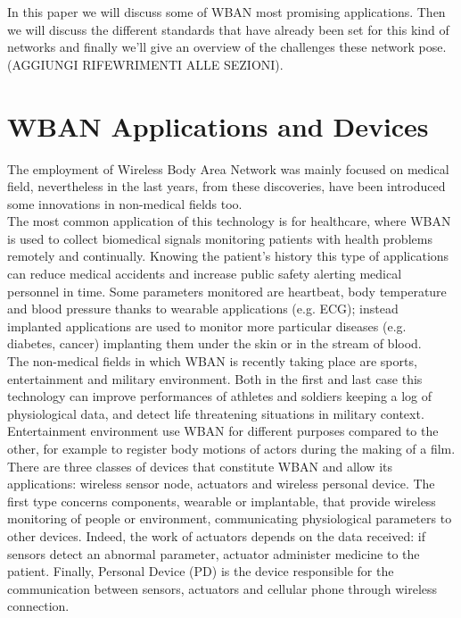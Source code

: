 \documentclass[conference]{IEEEtran}
\begin{document}
In this paper we will discuss some of WBAN most promising applications. Then we will discuss the different standards that have already been set for this kind of networks and finally we’ll give an overview of the challenges these network pose. (AGGIUNGI RIFEWRIMENTI ALLE SEZIONI).




\section{WBAN Applications and Devices}
The employment of Wireless Body Area Network was mainly focused on medical field, nevertheless in the last years, from these discoveries, have been introduced some innovations in non-medical fields too.
\\The most common application of this technology is for healthcare, where WBAN is used to collect biomedical signals monitoring patients with health problems remotely and continually. 
Knowing the patient's history this type of applications can reduce medical accidents and increase public safety alerting medical personnel in time. Some parameters monitored are heartbeat, body temperature and blood pressure thanks to wearable applications (e.g. ECG); instead implanted applications are used to monitor more particular diseases (e.g. diabetes, cancer) implanting them under the skin or in the stream of blood.
\\The non-medical fields in which WBAN is recently taking place are sports, entertainment and military environment. Both in the first and last case this technology can improve performances of athletes and soldiers keeping a log of physiological data, and detect life threatening situations in military context. Entertainment environment use WBAN for different purposes compared to the other, for example to register body motions of actors during the making of a film.
\\There are three classes of devices that constitute WBAN and allow its applications: wireless sensor node, actuators and wireless personal device. The first type concerns components, wearable or implantable, that provide wireless monitoring of people or environment, communicating physiological parameters to other devices. Indeed, the work of actuators depends on the data received: if sensors detect an abnormal parameter, actuator administer medicine to the patient. Finally, Personal Device (PD) is the device responsible for the communication between sensors, actuators and cellular phone through wireless connection. \cite{salayma2017wireless}
\end{document}
